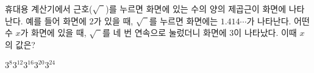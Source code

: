 휴대용 계산기에서 근호($\sqrt{\phantom{0}}$)를 누르면 화면에 있는 수의 양의 제곱근이 화면에 나타난다. 예를 들어 화면에 $2$가 있을 때, $\sqrt{\phantom{0}}$를 누르면 화면에는 $1.414\cdots$가 나타난다. 어떤 수 $x$가 화면에 있을 때, $\sqrt{\phantom{0}}$를 네 번 연속으로 눌렀더니 화면에 $3$이 나타났다. 이때 $x$의 값은?
\begin{choices32}{$3^8$}{$3^{12}$}{$3^{16}$}{$3^{20}$}{$3^{24}$}\end{choices32}
